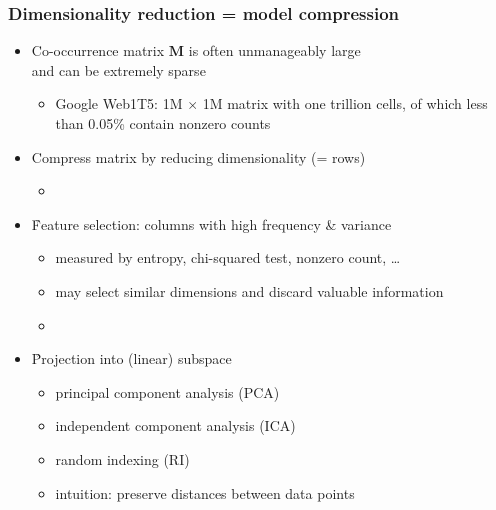 \documentclass[t]{beamer} %
\begin{document}
\begin{frame}
  \frametitle{Dimensionality reduction = model compression}

  \begin{itemize}
  \item Co-occurrence matrix $\mathbf{M}$ is often unmanageably large\\
    and can be extremely sparse
    \begin{itemize}
    \item Google Web1T5: 1M $\times$ 1M matrix with one trillion
      cells, of which less than 0.05\% contain nonzero counts \citep{Evert:10a}
    \end{itemize}
  \item[\So] Compress matrix by reducing dimensionality (= rows)
    \begin{itemize}
    \item[]\pause
    \end{itemize}
  \item \h{Feature selection}: columns with high frequency \& variance
    \begin{itemize}
    \item measured by entropy, chi-squared test, nonzero count, \ldots
    \item may select similar dimensions and discard valuable information
    \item[]
    \end{itemize}
    \pause
  \item \h{Projection} into (linear) subspace
    \begin{itemize}
    \item principal component analysis (PCA)
    \item independent component analysis (ICA)
    \item random indexing (RI)
    \item[\hand] intuition: preserve distances between data points
    \end{itemize}
  \end{itemize}
\end{frame}
\end{document}
